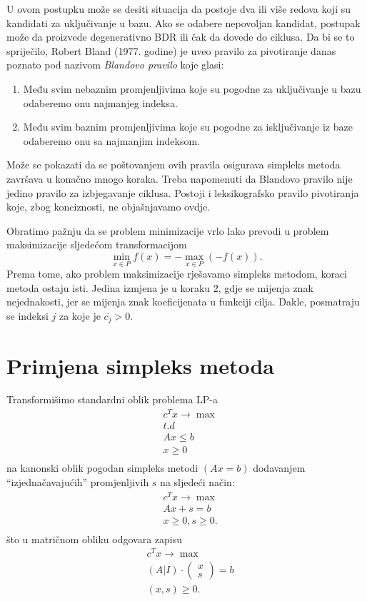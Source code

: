 \documentclass[a4paper, utf8, 11pt, colorlinks]{book}
\theoremstyle{definition}
\begin{document}
U ovom postupku  može se desiti situacija da postoje dva ili više redova koji su kandidati za uključivanje u bazu. Ako se odabere nepovoljan kandidat, postupak može da proizvede degenerativno BDR ili čak da dovede do ciklusa. 
Da bi se to spriječilo, Robert Bland (1977. godine) je uveo pravilo za pivotiranje danas poznato pod
nazivom \emph{Blandovo pravilo} koje glasi:
\begin{enumerate}
	\item   Među svim nebaznim promjenljivima koje su pogodne za uključivanje u bazu odaberemo onu najmanjeg indeksa. 
    \item Među svim baznim promjenljivima koje su pogodne za isključivanje iz baze odaberemo onu sa najmanjim indeksom.
\end{enumerate}
Može se pokazati da se poštovanjem ovih pravila osigurava simpleks metoda  završava u konačno mnogo koraka. Treba napomenuti da Blandovo pravilo nije jedino pravilo za izbjegavanje ciklusa. Postoji i leksikografsko pravilo pivotiranja koje, zbog konciznosti, ne objašnjavamo ovdje.  

Obratimo pažnju da se problem minimizacije vrlo lako prevodi u problem maksimizacije sljedećom transformacijom
$$ \min_{ x \in P} f(x) = - \max_{x \in P}(-f(x)).$$ 
Prema tome, ako  problem maksimizacije rješavamo simpleks metodom, koraci metoda ostaju isti. Jedina izmjena je u koraku 2, gdje se mijenja znak nejednakosti, jer se mijenja znak koeficijenata u funkciji cilja.  Dakle, posmatraju se indeksi $j$ za koje je $\overline{c_j} > 0$.

\section{Primjena simpleks metoda}
Transformišimo standardni oblik problema LP-a
  \begin{align*}
    & c^T x \rightarrow \max \\
    & {t.d} \nonumber \\
    & Ax \leq b \\
    & x \geq 0\\
\end{align*}
na kanonski oblik pogodan simpleks metodi $(A {x} = b)$ dodavanjem ``izjednačavajućih'' promjenljivih $s$ na sljedeći način:
\begin{align}
    & c^T x \rightarrow \max \\
    & Ax + s =  b \\
    & x \geq 0, s \geq 0. \\
\end{align}
što u matričnom obliku odgovara zapisu
\begin{align}
    & c^T x \rightarrow \max \\
    & (A | I) \cdot \left (\begin{array}{c}
         x  \\
         s 
    \end{array} \right ) =  b \\
    & (x, s) \geq 0. \\
\end{align} 
\end{document}
